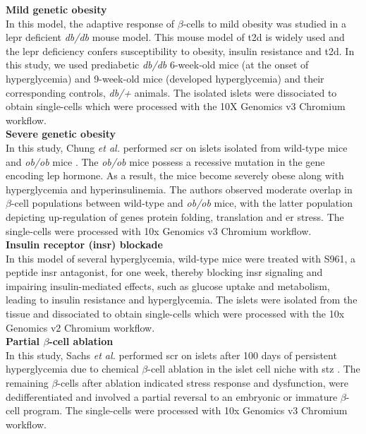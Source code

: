 \textbf{Mild genetic obesity\\}
In this model, the adaptive response of $\beta$-cells to mild obesity was studied in a \gls{lepr} deficient \textit{db/db} mouse model. This mouse model of \gls{t2d} is widely used and the \gls{lepr} deficiency confers susceptibility to obesity, insulin resistance and \gls{t2d}. In this study, we used prediabetic \textit{db/db} 6-week-old mice (at the onset of hyperglycemia) and 9-week-old mice (developed hyperglycemia) and their corresponding controls, \textit{db/+} animals. The isolated islets were dissociated to obtain single-cells which were processed with the 10X Genomics v3 Chromium workflow.\\

\textbf{Severe genetic obesity\\}
In this study, Chung \textit{et al.} performed \gls{scr} on islets isolated from wild-type mice and \textit{ob/ob} mice \textbf{\cite{chung_endocrine-exocrine_2020}}. The \textit{ob/ob} mice possess a recessive mutation in the gene encoding \gls{lep} hormone. As a result, the mice become severely obese along with hyperglycemia and hyperinsulinemia. The authors observed moderate overlap in $\beta$-cell populations between wild-type and \textit{ob/ob} mice, with the latter population depicting up-regulation of genes protein folding, translation and \gls{er} stress. The single-cells were processed with 10x Genomics v3 Chromium workflow.\\

\textbf{Insulin receptor (\gls{insr}) blockade\\}
In this model of several hyperglycemia, wild-type mice were treated with S961, a peptide \gls{insr} antagonist, for one week, thereby blocking \gls{insr} signaling and impairing insulin-mediated effects, such as glucose uptake and metabolism, leading to insulin resistance and hyperglycemia. The islets were isolated from the tissue and dissociated to obtain single-cells which were processed with the 10x Genomics v2 Chromium workflow.\\

\textbf{Partial $\beta$-cell ablation\\}
In this study, Sachs \textit{et al.} performed \gls{scr} on islets after 100 days of persistent hyperglycemia due to chemical $\beta$-cell ablation in the islet cell niche with \gls{stz} \textbf{\cite{sachs_targeted_2020}}. The remaining $\beta$-cells after ablation indicated  stress response and dysfunction, were dedifferentiated and involved a partial reversal to an embryonic or immature $\beta$-cell program. The single-cells were processed with 10x Genomics v3 Chromium workflow.\\


